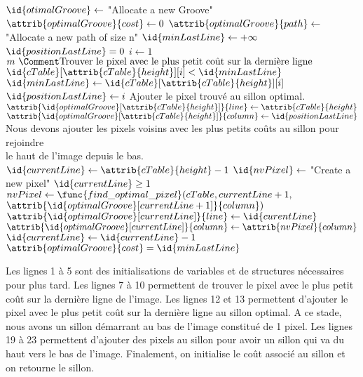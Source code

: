 \documentclass[a4paper, 11pt, oneside]{article}
\begin{document}
\begin{codebox} %
        \li $\id{otimalGroove} \gets$ "Allocate a new Groove"
        \li $\attrib{optimalGroove}{cost} \gets 0$
        \li $\attrib{optimalGroove}{path} \gets$ "Allocate a new path of size n"
        \li $\id{minLastLine} \gets +\infty$
        \li $\id{positionLastLine} = 0$
        \li
        \li \For $i \gets 1$ \To $m \text{ }\Comment \text{Trouver le pixel avec le plus petit coût sur la dernière ligne}$
                \Do
        \li     	\If $\id{cTable}[\attrib{cTable}{height}][i] < \id{minLastLine}$
        \li 			\Then
        					$\id{minLastLine} \gets \id{cTable}[\attrib{cTable}{height}][i]$
        	\li				$\id{positionLastLine} \gets i$
        				\End
                \End
        \li \Comment Ajouter le pixel trouvé au sillon optimal.
        \li $\attrib{\id{optimalGroove}[\attrib{cTable}{height}]}{line} \gets \attrib{cTable}{height}$
        \li $\attrib{\id{optimalGroove}[\attrib{cTable}{height}]}{column} \gets \id{positionLastLine}$
        \li
        \li \Comment Nous devons ajouter les pixels voisins avec les plus petits coûts au sillon pour rejoindre\\ \hspace {0.3cm} le haut de l'image depuis le bas.
        \li $\id{currentLine} \gets \attrib{cTable}{height} - 1$
        \li $\id{nvPixel} \gets$ "Create a new pixel"
        \li
        \li \While $\id{currentLine} \geq 1$
        \li	\Do
        		$nvPixel \gets \func{find\_optimal\_pixel}(cTable, currentLine + 1,$ \\ \hspace{9cm} $\attrib{\id{optimalGroove}[currentLine + 1]}{column})$
        \li		$\attrib{\id{optimalGroove}[currentLine]}{line} \gets \id{curentLine}$
        \li		$\attrib{\id{optimalGroove}[currentLine]}{column} \gets \attrib{nvPixel}{column}$
        \li		$\id{currentLine} \gets \id{currentLine} - 1$
        \li	\End
        \li	$\attrib{optimalGroove}{cost} = \id{minLastLine}$
        \li \Return {}
\end{codebox}

Les lignes 1 à 5 sont des initialisations de variables et de structures nécessaires pour plus tard. Les lignes 7 à 10 permettent de trouver le pixel avec le plus petit coût sur la dernière ligne de l'image. Les lignes 12 et 13 permettent d'ajouter le pixel avec le plus petit coût sur la dernière ligne au sillon optimal. A ce stade, nous avons un sillon démarrant au bas de l'image constitué de 1 pixel. Les lignes 19 à 23 permettent d'ajouter des pixels au sillon pour avoir un sillon qui va du haut vers le bas de l'image. Finalement, on initialise le coût associé au sillon et on retourne le sillon.
\end{document}
